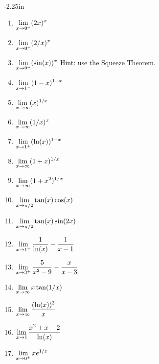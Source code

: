 \begin{adjustwidth*}{}{-2.25in}
\begin{multicols*}{2}
\begin{enumerate}[1),resume]
\item {$\displaystyle \lim_{x\to 0^+} (2x)^{x}$}
\item {$\displaystyle \lim_{x\to 0^+} (2/x)^{x}$}
\item {$\displaystyle \lim_{x\to 0^+} (\sin (x))^{x}$ \quad Hint: use the Squeeze Theorem.}
\item {$\displaystyle \lim_{x\to 1^-} (1-x)^{1-x}$}
\item {$\displaystyle \lim_{x\to \infty} (x)^{1/x}$}
\item {$\displaystyle \lim_{x\to \infty} (1/x)^{x}$}
\item {$\displaystyle \lim_{x\to 1^+} (\ln (x))^{1-x}$}
\item {$\displaystyle \lim_{x\to \infty} (1+x)^{1/x}$}
\item {$\displaystyle \lim_{x\to \infty} (1+x^2)^{1/x}$}
\item {$\displaystyle \lim_{x\to \pi/2} \tan (x)\cos (x)$}
\item {$\displaystyle \lim_{x\to \pi/2} \tan (x)\sin (2x)$}
\item {$\displaystyle \lim_{x\to 1^+} \frac{1}{\ln (x)} - \frac{1}{x-1}$}
\item {$\displaystyle \lim_{x\to 3^+} \frac{5}{x^2-9} - \frac{x}{x-3}$}
\item {$\displaystyle \lim_{x\to \infty} x\tan (1/x)$}
\item {$\displaystyle \lim_{x\to \infty} \frac{(\ln (x))^3}{x}$}
\item {$\displaystyle \lim_{x\to 1} \frac{x^2+x-2}{\ln (x)}$}
\item {$\displaystyle \lim_{x\to 0^+} xe^{1/x}$}
\end{enumerate}

\end{multicols*}
\end{adjustwidth*}

\afterexercises